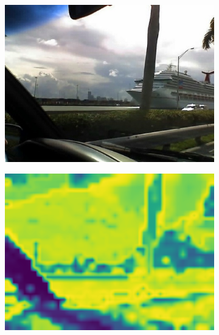 \begin{figure}[t]
\centering
\begin{subfigure}{0.3\textwidth}
    \centering
    \includegraphics[width=\linewidth]{figures/experiments/entropymaps/finetuned/13/0013.jpg}
\end{subfigure}
\begin{subfigure}{0.3\textwidth}
    \centering
    \includegraphics[width=\linewidth]{figures/experiments/entropymaps/finetuned/13/entropy_mapwithoutcb.png}
\end{subfigure}
\begin{subfigure}{0.3\textwidth}
\label{fig:postregentropy}
    \centering

\end{subfigure}
\end{figure}
